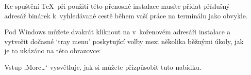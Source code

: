 \documentclass[\classoptions,slovak,english,czech]{\classname}
\newcommand{\singleuv}[1]{,#1`}
\begin{document}
Ke spuštění \TeX\ při použití této přenosné instalace musíte přidat 
příslušný adresář binárek k~vyhledávané cestě 
během vaší práce na terminálu jako obvykle. 

Pod Windows můžete dvakrát kliknout
na  v~kořenovém adresáři instalace a 
vytvořit dočasné `tray menu' poskytující volby mezi 
několika běžnými úkoly, jak je to ukázáno na této obrazovce:

\medskip
{}
\smallskip

\noindent Vstup \singleuv{More\ldots} vysvětluje, jak si můžete 
přizpůsobit tuto nabídku.


%
%
%
%
%
%
%
\end{document}
